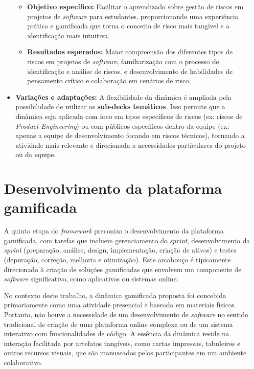 \documentclass[
	12pt,
	openright,
	twoside,
	a4paper,
	english,
	brazil
	]{abntex2}
\begin{document}
\begin{itemize}
\begin{itemize}
\item \textbf{Objetivo específico:} Facilitar o aprendizado sobre gestão de riscos em projetos de \textit{software} para estudantes, proporcionando uma experiência prática e gamificada que torna o conceito de risco mais tangível e a identificação mais intuitiva. 
\item \textbf{Resultados esperados:} Maior compreensão dos diferentes tipos de riscos em projetos de \textit{software}, familiarização com o processo de identificação e análise de riscos, e desenvolvimento de habilidades de pensamento crítico e colaboração em cenários de risco. 
\end{itemize}
\item \textbf{Variações e adaptações:} A flexibilidade da dinâmica é ampliada pela possibilidade de utilizar os \textbf{sub-decks temáticos}. Isso permite que a dinâmica seja aplicada com foco em tipos específicos de riscos (ex: riscos de \textit{Product Engineering}) ou com públicos específicos dentro da equipe (ex: apenas a equipe de desenvolvimento focando em riscos técnicos), tornando a atividade mais relevante e direcionada a necessidades particulares do projeto ou da equipe. 
\end{itemize}

\section{Desenvolvimento da plataforma gamificada}
\label{sec:desenvolvimento-plataforma-gamificada}

A quinta etapa do \textit{framework} preconiza o desenvolvimento da plataforma gamificada, com tarefas que incluem gerenciamento do \textit{sprint}, desenvolvimento da \textit{sprint} (preparação, análise, design, implementação, criação de ativos) e testes (depuração, correção, melhoria e otimização). Este arcabouço é tipicamente direcionado à criação de soluções gamificadas que envolvem um componente de \textit{software} significativo, como aplicativos ou sistemas online.

No contexto deste trabalho, a dinâmica gamificada proposta foi concebida primariamente como uma atividade presencial e baseada em materiais físicos. Portanto, não houve a necessidade de um desenvolvimento de \textit{software} no sentido tradicional de criação de uma plataforma online complexa ou de um sistema interativo com funcionalidades de código. A essência da dinâmica reside na interação facilitada por artefatos tangíveis, como cartas impressas, tabuleiros e outros recursos visuais, que são manuseados pelos participantes em um ambiente colaborativo.
\end{document}
